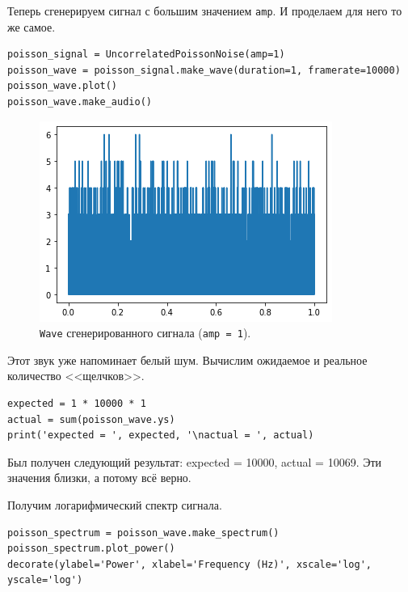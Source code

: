 \documentclass[a4paper, 14pt]{extarticle}
\begin{document}
    Теперь сгенерируем сигнал с большим значением \texttt{amp}. И проделаем для него то же самое.

    \begin{lstlisting}[caption= Генерация сигнала с \texttt{amp = 1}., label={lst:task4_large_signal}]
poisson_signal = UncorrelatedPoissonNoise(amp=1)
poisson_wave = poisson_signal.make_wave(duration=1, framerate=10000)
poisson_wave.plot()
poisson_wave.make_audio()   \end{lstlisting}

    \begin{figure}[h]
        \centering
        \includegraphics[width=0.7\linewidth]{resources/Images/task4_large_wave}
        \caption{\texttt{Wave} сгенерированного сигнала (\texttt{amp = 1}).}
        \label{fig:task4_large_wave}
    \end{figure}

    Этот звук уже напоминает белый шум. Вычислим ожидаемое и реальное количество <<щелчков>>.

    \begin{lstlisting}[caption= Проверка количества частиц \texttt{(amp = 1)}., label={lst:task4_large_check}]
expected = 1 * 10000 * 1
actual = sum(poisson_wave.ys)
print('expected = ', expected, '\nactual = ', actual)   \end{lstlisting}

    Был получен следующий результат: expected = 10000, actual = 10069. Эти значения близки, а потому всё верно.

    Получим логарифмический спектр сигнала.

    \begin{lstlisting}[caption= Вычисление логарифмического спектра сигнала \texttt{(amp = 1)}., label={lst:task4_large_spectrum_log}]
poisson_spectrum = poisson_wave.make_spectrum()
poisson_spectrum.plot_power()
decorate(ylabel='Power', xlabel='Frequency (Hz)', xscale='log', yscale='log')   \end{lstlisting}
\end{document}
